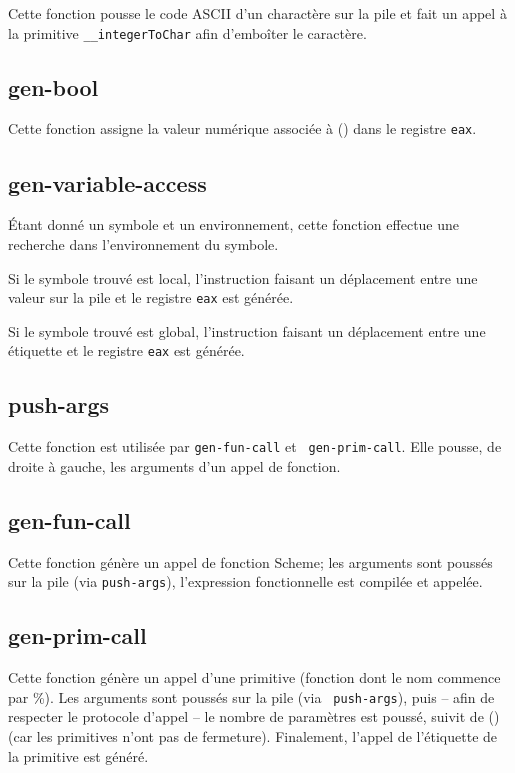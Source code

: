 \documentclass[11pt]{report}
\begin{document}
Cette fonction pousse le code ASCII d'un charactère sur la pile et
fait un appel à la primitive {\tt __integerToChar} afin d'emboîter le
caractère.

\subsection{gen-bool}

Cette fonction assigne la valeur numérique associée à () dans le
registre {\tt eax}.

\subsection{gen-variable-access}

Étant donné un symbole et un environnement, cette fonction effectue
une recherche dans l'environnement du symbole.

Si le symbole trouvé est local, l'instruction faisant un déplacement
entre une valeur sur la pile et le registre {\tt eax} est générée.

Si le symbole trouvé est global, l'instruction faisant un déplacement
entre une étiquette et le registre {\tt eax} est générée.

\subsection{push-args}

Cette fonction est utilisée par {\tt gen-fun-call} et {\tt
  gen-prim-call}.  Elle pousse, de droite à gauche, les arguments d'un
appel de fonction.

\subsection{gen-fun-call}

Cette fonction génère un appel de fonction Scheme; les arguments sont
poussés sur la pile (via {\tt push-args}), l'expression fonctionnelle
est compilée et appelée.

\subsection{gen-prim-call}

Cette fonction génère un appel d'une primitive (fonction dont le nom
commence par \%).  Les arguments sont poussés sur la pile (via {\tt
  push-args}), puis -- afin de respecter le protocole d'appel -- le
nombre de paramètres est poussé, suivit de () (car les primitives
n'ont pas de fermeture).  Finalement, l'appel de l'étiquette de la
primitive est généré.
\end{document}
